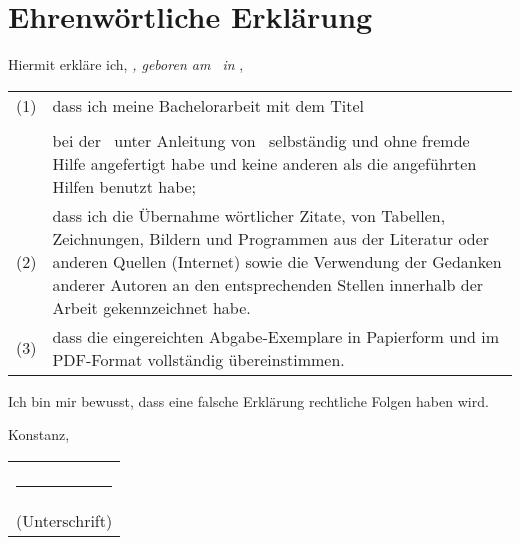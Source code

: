 \chapter*{Ehrenw\"{o}rtliche Erkl\"{a}rung}

Hiermit erkläre ich,
\textit{\authorName, geboren am \authorBirthday\ in \authorBirthdayCity},\\
\noindent
\begin{tabular}{p{}p{}}
	(1) & dass ich meine Bachelorarbeit mit dem Titel \\[1em]
		& \textbf{\topic} \\[1em]
		& bei der \companyName\ unter Anleitung von \proffessor\ selbständig und ohne fremde Hilfe angefertigt habe und keine anderen als die angeführten Hilfen benutzt habe;\\[1em]
	(2) & dass ich die Übernahme wörtlicher Zitate, von Tabellen, Zeichnungen, Bildern und Programmen aus der Literatur oder anderen Quellen (Internet) sowie die Verwendung der Gedanken anderer Autoren an den entsprechenden Stellen innerhalb der Arbeit gekennzeichnet habe.\\[1em]
	(3) & dass die eingereichten Abgabe-Exemplare in Papierform und im PDF-Format vollständig übereinstimmen.\\
\end{tabular}
\vspace*{1cm}

\noindent
Ich bin mir bewusst, dass eine falsche Erklärung rechtliche Folgen haben wird.
\vspace*{3cm}

\noindent
Konstanz, \closingdate\hfill \begin{tabular}{c} \\ \\ \rule{5cm}{1pt} \\ (Unterschrift)
\end{tabular}
